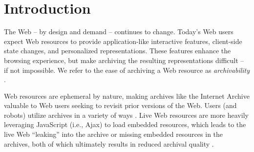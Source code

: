 \documentclass{ipres_proc_article-sp}
\begin{document}


\section{Introduction}
\label{introduction}
The Web -- by design and demand -- continues to change. Today's Web users expect Web resources to provide application-like interactive features, client-side state changes, and personalized representations. These features enhance the browsing experience, but make archiving the resulting representations difficult -- if not impossible. We refer to the ease of archiving a Web resource as \emph{archivability} \cite{ijdl}. 


Web resources are ephemeral by nature, making archives like the Internet Archive \cite{iawebarchive, waybackarchives2} valuable to Web users seeking to revisit prior versions of the Web. Users (and robots) utilize archives in a variety of ways \cite{usingIA, marshalls_social_media_study, yasminLinks}. Live Web resources are more heavily leveraging JavaScript (i.e., Ajax) to load embedded resources, which leads to the live Web ``leaking'' into the archive \cite{zombies} or missing embedded resources in the archives, both of which ultimately results in reduced archival quality \cite{brunelleDamage}.
\end{document}
